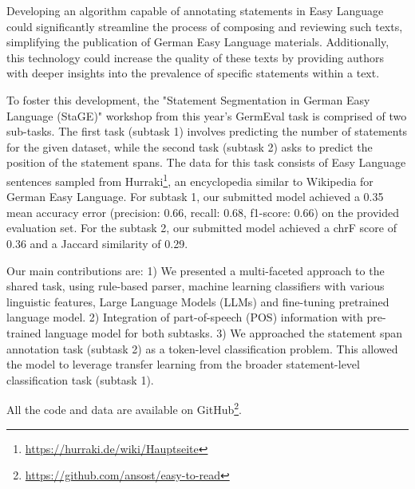 \documentclass[11pt]{article}
\begin{document}
Developing an algorithm capable of annotating statements in Easy Language could significantly streamline the process of composing and reviewing such texts, simplifying the publication of German Easy Language materials. Additionally, this technology could increase the quality of these texts by providing authors with deeper insights into the prevalence of specific statements within a text.

To foster this development, the "Statement Segmentation in German Easy Language (StaGE)" workshop from this year's GermEval task is comprised of two sub-tasks. The first task (subtask 1) involves predicting the number of statements for the given dataset, while the second task (subtask 2) asks to predict the position of the statement spans. The data for this task consists of Easy Language sentences sampled from Hurraki\footnote{\url{https://hurraki.de/wiki/Hauptseite}}, an encyclopedia similar to Wikipedia for German Easy Language. For subtask 1, our submitted model achieved a 0.35 mean accuracy error (precision: 0.66, recall: 0.68, f1-score: 0.66) on the provided evaluation set. For the subtask 2, our submitted model achieved a chrF score of 0.36 and a Jaccard similarity of 0.29. 

Our main contributions are: 1) We presented a multi-faceted approach to the shared task, using rule-based parser, machine learning classifiers with various linguistic features, Large Language Models (LLMs) and fine-tuning pretrained language model. 2) Integration of part-of-speech (POS) information with pre-trained language model for both subtasks. 3) We approached the statement span annotation task (subtask 2) as a token-level classification problem. This allowed the model to leverage transfer learning from the broader statement-level classification task (subtask 1).



All the code and data are available on GitHub\footnote{\url{https://github.com/ansost/easy-to-read}}.

\end{document}
